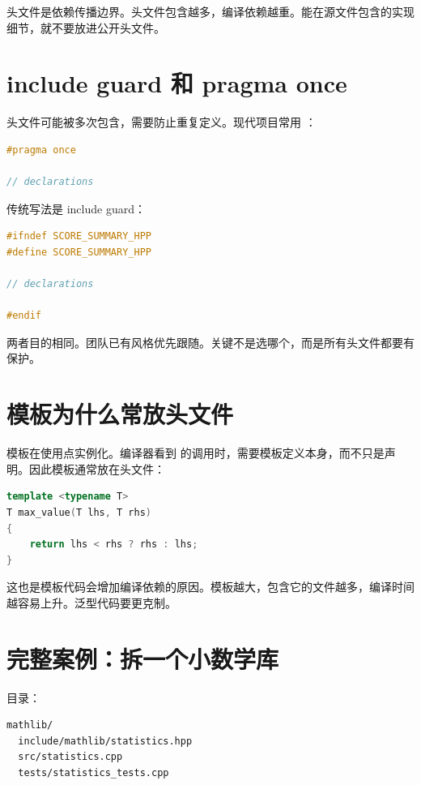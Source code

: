 头文件是依赖传播边界。头文件包含越多，编译依赖越重。能在源文件包含的实现细节，就不要放进公开头文件。

\section{include guard 和 pragma once}

头文件可能被多次包含，需要防止重复定义。现代项目常用 ：

\begin{lstlisting}[language=C++,caption={防止头文件重复包含}]
#pragma once

// declarations
\end{lstlisting}

传统写法是 include guard：

\begin{lstlisting}[language=C++,caption={传统 include guard}]
#ifndef SCORE_SUMMARY_HPP
#define SCORE_SUMMARY_HPP

// declarations

#endif
\end{lstlisting}

两者目的相同。团队已有风格优先跟随。关键不是选哪个，而是所有头文件都要有保护。

\section{模板为什么常放头文件}

模板在使用点实例化。编译器看到  的调用时，需要模板定义本身，而不只是声明。因此模板通常放在头文件：

\begin{lstlisting}[language=C++,caption={模板定义放头文件}]
template <typename T>
T max_value(T lhs, T rhs)
{
    return lhs < rhs ? rhs : lhs;
}
\end{lstlisting}

这也是模板代码会增加编译依赖的原因。模板越大，包含它的文件越多，编译时间越容易上升。泛型代码要更克制。

\section{完整案例：拆一个小数学库}

目录：

\begin{lstlisting}[caption={小库目录}]
mathlib/
  include/mathlib/statistics.hpp
  src/statistics.cpp
  tests/statistics_tests.cpp
\end{lstlisting}

